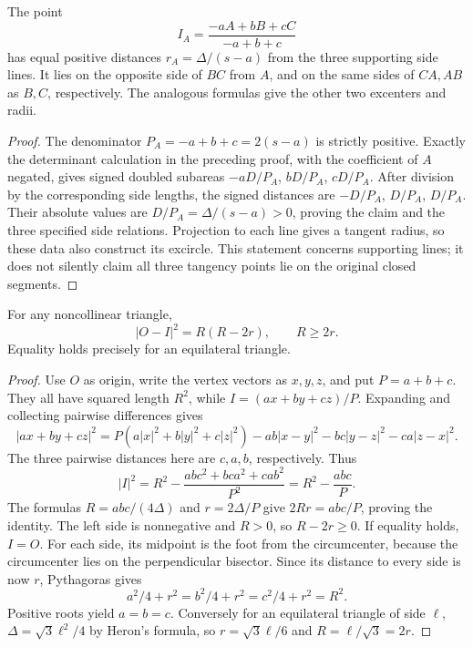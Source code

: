 \begin{theorem}
\label{tri:excenters}
The point
\[
 I_A=\frac{-aA+bB+cC}{-a+b+c}
\]
has equal positive distances $r_A=\Delta/(s-a)$ from the three supporting
side lines.  It lies on the opposite side of $BC$ from $A$, and on the
same sides of $CA,AB$ as $B,C$, respectively.  The analogous formulas
give the other two excenters and radii.
\end{theorem}
\begin{proof}
The denominator $P_A=-a+b+c=2(s-a)$ is strictly positive.
Exactly the determinant calculation in the preceding proof, with the
coefficient of $A$ negated, gives signed doubled subareas
$-aD/P_A$, $bD/P_A$, $cD/P_A$.
After division by the corresponding side lengths, the signed distances
are $-D/P_A$, $D/P_A$, $D/P_A$.
Their absolute values are $D/P_A=\Delta/(s-a)>0$, proving the claim
and the three specified side relations.  Projection to each line gives
a tangent radius, so these data also construct its excircle.  This
statement concerns supporting lines; it does not silently claim all
three tangency points lie on the original closed segments.
\end{proof}

\begin{theorem}
\label{tri:euler-inequality}
For any noncollinear triangle,
\[
 |O-I|^2=R(R-2r),\qquad R\ge2r.
\]
Equality holds precisely for an equilateral triangle.
\end{theorem}
\begin{proof}
Use $O$ as origin, write the vertex vectors as $x,y,z$, and put
$P=a+b+c$.  They all have squared length $R^2$, while
$I=(ax+by+cz)/P$.  Expanding and collecting pairwise differences gives
\[
 |ax+by+cz|^2
 =P(a|x|^2+b|y|^2+c|z|^2)
   -ab|x-y|^2-bc|y-z|^2-ca|z-x|^2.
\]
The three pairwise distances here are $c,a,b$, respectively.  Thus
\[
 |I|^2=R^2-\frac{ab c^2+bc a^2+ca b^2}{P^2}
       =R^2-\frac{abc}{P}.
\]
The formulas $R=abc/(4\Delta)$ and $r=2\Delta/P$ give
$2Rr=abc/P$, proving the identity.
The left side is nonnegative and $R>0$, so $R-2r\ge0$.
If equality holds, $I=O$.  For each side, its midpoint is the foot from
the circumcenter, because the circumcenter lies on the perpendicular
bisector.  Since its distance to every side is now $r$, Pythagoras gives
\[
 a^2/4+r^2=b^2/4+r^2=c^2/4+r^2=R^2.
\]
Positive roots yield $a=b=c$.
Conversely for an equilateral triangle of side $\ell$,
$\Delta=\sqrt3\ell^2/4$ by Heron's formula, so
$r=\sqrt3\ell/6$ and $R=\ell/\sqrt3=2r$.
\end{proof}

